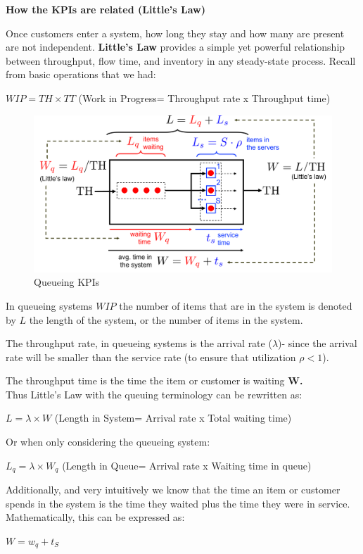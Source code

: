 \documentclass[
  letterpaper,
  DIV=11,
  numbers=noendperiod]{scrartcl}
\begin{document}
\textbf{How the KPIs are related (Little's Law)}

Once customers enter a system, how long they stay and how many are
present are not independent. \textbf{Little's Law} provides a simple yet
powerful relationship between throughput, flow time, and inventory in
any steady-state process. Recall from basic operations that we had:

\(WIP=TH\times TT\) (Work in Progress= Throughput rate x Throughput
time)

\begin{figure}[H]

{\centering \includegraphics[width=0.5\linewidth,height=\textheight,keepaspectratio]{queueing_KPI.png}

}

\caption{Queueing KPIs}

\end{figure}%

In queueing systems \(WIP\) the number of items that are in the system
is denoted by \(L\) the length of the system, or the number of items in
the system.

The throughput rate, in queueing systems is the arrival rate
(\(\lambda\))- since the arrival rate will be smaller than the service
rate (to ensure that utilization \(\rho<1\)).

The throughput time is the time the item or customer is waiting
\textbf{W.}\\
Thus Little's Law with the queuing terminology can be rewritten as:

\(L=\lambda \times W\) (Length in System= Arrival rate x Total waiting
time)

Or when only considering the queueing system:

\(L_q=\lambda \times W_q\) (Length in Queue= Arrival rate x Waiting time
in queue)

Additionally, and very intuitively we know that the time an item or
customer spends in the system is the time they waited plus the time they
were in service. Mathematically, this can be expressed as:

\(W=w_q+t_S\)
\end{document}
